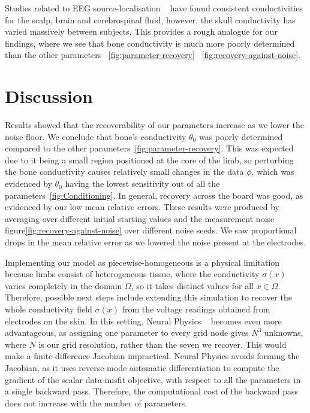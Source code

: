 \documentclass[final-report]{report-template}
\begin{document}
Studies related to EEG source-localisation ~\cite{akalinacar2016} have found consistent conductivities for the scalp, brain and cerebrospinal fluid, however, the skull conductivity has varied massively between subjects. This provides a rough analogue for our findings, where we see that bone conductivity is much more poorly determined than the other parameters ~\ref{fig:parameter-recovery} ~\ref{fig:recovery-against-noise}.

\section{Discussion}

Results showed that the recoverability of our parameters increase as we lower the noise-floor. We conclude that bone's conductivity $\theta_0$ was poorly determined compared to the other parameters~\ref{fig:parameter-recovery}. This was expected due to it being a small region positioned at the core of the limb, so perturbing the bone conductivity causes relatively small changes in the data $\phi$, which was evidenced by $\theta_0$ having the lowest sensitivity out of all the parameters~\ref{fig:Conditioning}. In general, recovery across the board was good, as evidenced by our low mean relative errors. These results were produced by averaging over different initial starting values and the measurement noise figure\ref{fig:recovery-against-noise} over different noise seeds. We saw proportional drops in the mean relative error as we lowered the noise present at the electrodes.

Implementing our model as piecewise-homogeneous is a physical limitation because limbs consist of heterogeneous tissue, where the conductivity $\sigma(x)$ varies completely in the domain $\Omega$, so it takes distinct values for all $x \in \Omega$. Therefore, possible next steps include extending this simulation to recover the whole conductivity field $\sigma(x)$ from the voltage readings obtained from electrodes on the skin. In this setting, Neural Physics ~\cite{chen2026} becomes even more advantageous, as assigning one parameter to every grid node gives $N^3$ unknowns, where $N$ is our grid resolution, rather than the seven we recover. This would make a finite-difference Jacobian impractical. Neural Physics avoids forming the Jacobian, as it uses reverse-mode automatic differentiation to compute the gradient of the scalar data-misfit objective, with respect to all the parameters in a single backward pass. Therefore, the computational cost of the backward pass does not increase with the number of parameters.
\end{document}
